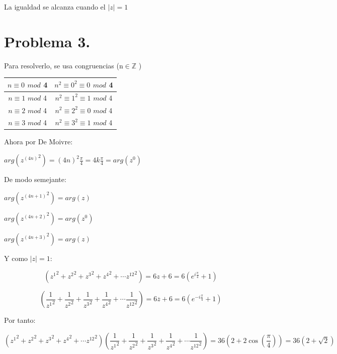 \documentclass[11pt]{article}
\theoremstyle{Tema} \newtheorem{Tema}{Tema} %
\theoremstyle{Tema} \newtheorem{serie}{Serie}              %
\theoremstyle{Tema} \newtheorem{ejercicio}{Ejercicio}    %
\begin{document}
La igualdad se alcanza cuando el $|z|=1$





\section*{\textbf{Problema 3.} }

\begin{exercise}

Para resolverlo, se usa congruencias (n$ \in  \mathbb{Z}$ )
\begin{center}
\begin{tabular}{|c|c|}
		\hline
	$ n\equiv 0 $ $mod $ 4&$ n^2\equiv 0^2\equiv 0$ $ mod $ 4\\
	\hline
	$ n\equiv 1 $ $mod $ 4&$ n^2\equiv 1^2\equiv 1 $ $ mod $ 4\\
	\hline
	$ n\equiv 2 $ $mod $ 4&$ n^2\equiv 2^2\equiv 0$ $ mod $ 4\\
	\hline
	$ n\equiv 3 $ $mod$ 4&$ n^2\equiv 3^2\equiv 1$ $ mod $ 4\\
	\hline
\end{tabular}
\end{center}

Ahora por De Moivre:

$ arg({z^{(4n)}}^2)= (4n)^2\frac{\pi}{4}= 4k\frac{\pi}{4} =arg(z^0)$

De modo semejante:

$ arg({z^{(4n+1)}}^2)=arg(z)$

$ arg({z^{(4n+2)}}^2)=arg(z^0)$


$ arg({z^{(4n+3)}}^2)=arg(z)$

\bigskip

Y como $ |z|=1 $:

\begin{equation*}
\left({z^1}^2+{z^2}^2+{z^3}^2+{z^4}^2+\cdots{z^{12}}^2\right)=6z+6=6(e^{i\frac{\pi}{4}}+1)
\end{equation*}


\begin{equation*}
\left(\dfrac{1}{{z^1}^2}+\dfrac{1}{{z^2}^2}+\dfrac{1}{{z^3}^2}+\dfrac{1}{{z^4}^2}+\cdots\dfrac{1}{{z^{12}}^2}\right)=6\overline{z}+6=6(e^{-i\frac{\pi}{4}}+1)
\end{equation*}

Por tanto:

\begin{equation*}
\left({z^1}^2+{z^2}^2+{z^3}^2+{z^4}^2+\cdots{z^{12}}^2\right)\left(\dfrac{1}{{z^1}^2}+\dfrac{1}{{z^2}^2}+\dfrac{1}{{z^3}^2}+\dfrac{1}{{z^4}^2}+\cdots\dfrac{1}{{z^{12}}^2}\right)=36(2+2\cos\left(\frac{\pi}{4}\right))=36(2+\sqrt{2})
\end{equation*}
\end{exercise}
\end{document}
